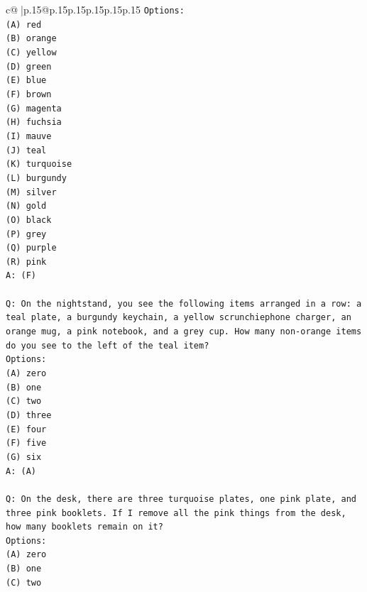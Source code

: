 \documentclass{article}
\begin{document}
{\begin{supertabular}{c@{$\;$}|p{.15\linewidth}@{}p{.15\linewidth}p{.15\linewidth}p{.15\linewidth}p{.15\linewidth}p{.15\linewidth}}
{{{\texttt{Options:} \\
\texttt{(A) red} \\
\texttt{(B) orange} \\
\texttt{(C) yellow} \\
\texttt{(D) green} \\
\texttt{(E) blue} \\
\texttt{(F) brown} \\
\texttt{(G) magenta} \\
\texttt{(H) fuchsia} \\
\texttt{(I) mauve} \\
\texttt{(J) teal} \\
\texttt{(K) turquoise} \\
\texttt{(L) burgundy} \\
\texttt{(M) silver} \\
\texttt{(N) gold} \\
\texttt{(O) black} \\
\texttt{(P) grey} \\
\texttt{(Q) purple} \\
\texttt{(R) pink} \\
\texttt{A: (F)} \\
\\ 
\texttt{Q: On the nightstand, you see the following items arranged in a row: a teal plate, a burgundy keychain, a yellow scrunchiephone charger, an orange mug, a pink notebook, and a grey cup. How many non{-}orange items do you see to the left of the teal item?} \\
\texttt{Options:} \\
\texttt{(A) zero} \\
\texttt{(B) one} \\
\texttt{(C) two} \\
\texttt{(D) three} \\
\texttt{(E) four} \\
\texttt{(F) five} \\
\texttt{(G) six} \\
\texttt{A: (A)} \\
\\ 
\texttt{Q: On the desk, there are three turquoise plates, one pink plate, and three pink booklets. If I remove all the pink things from the desk, how many booklets remain on it?} \\
\texttt{Options:} \\
\texttt{(A) zero} \\
\texttt{(B) one} \\
\texttt{(C) two} \\
}}}
\end{supertabular}}
\end{document}
